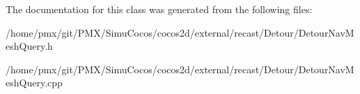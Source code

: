 The documentation for this class was generated from the following files\+:\begin{DoxyCompactItemize}
\item 
/home/pmx/git/\+P\+M\+X/\+Simu\+Cocos/cocos2d/external/recast/\+Detour/Detour\+Nav\+Mesh\+Query.\+h\item 
/home/pmx/git/\+P\+M\+X/\+Simu\+Cocos/cocos2d/external/recast/\+Detour/Detour\+Nav\+Mesh\+Query.\+cpp\end{DoxyCompactItemize}
